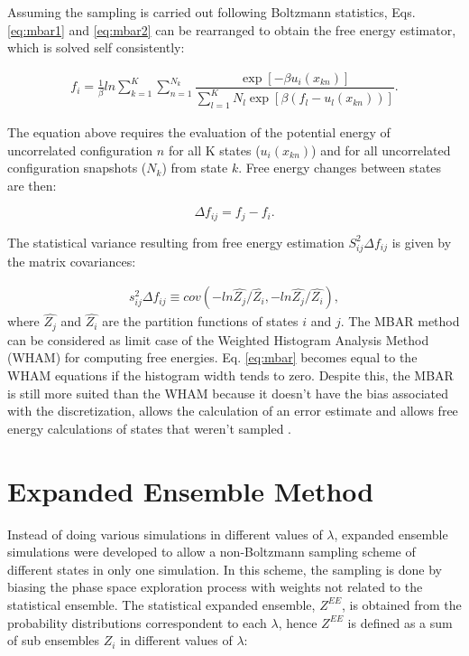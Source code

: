 	Assuming the sampling is carried out following Boltzmann statistics, Eqs. \eqref{eq:mbar1} and \eqref{eq:mbar2} can be rearranged to obtain the free energy estimator, which is solved self consistently:  
	
	\begin{equation}
	\label{eq:mbar}
	\begin{aligned}
	f_{i} = \frac{1}{\beta}ln \sum_{k=1}^{K} \sum_{n=1}^{N_{k}}
	\dfrac{\exp[-\beta u_{i}(x_{kn})]}{\sum_{l=1}^{K} N_{l} \exp[\beta (f_{l} - u_{l}(x_{kn}))]} .
	\end{aligned}
	\end{equation}
	
	The equation above requires the evaluation of the potential energy  of uncorrelated configuration $n$ for all K states ($u_{i}(x_{kn})$) and for all uncorrelated configuration snapshots ($N_{k}$) from state $k$. Free energy changes between states are then:
	
	\begin{equation}
	\Delta f_{ij} = f_{j} -  f_{i}  .
	\end{equation} 
	
	The statistical variance resulting from free energy estimation $S_{ij}^{2} \Delta f_{ij}$ is given by the matrix covariances:
	
	\begin{equation}
	\label{eq:varmbar}
	\begin{aligned}
	s_{ij}^{2} \Delta f_{ij} \equiv cov (-ln \hat{Z_{j}}/\hat{Z_{i}},-ln \hat{Z_{j}}/\hat{Z_{i}}),
	\end{aligned}
	\end{equation}
	where $\hat{Z_{j}}$ and $\hat{Z_{i}}$ are the partition functions of states $i$ and $j$. The MBAR method can be considered as limit case of the 
	Weighted Histogram Analysis Method (WHAM) \cite{wham} for computing free energies. Eq. \eqref{eq:mbar} becomes equal to the WHAM equations if the histogram width tends to zero. Despite this, the MBAR is still more suited than the WHAM because it doesn't have the bias associated with the discretization, allows the calculation of an error estimate and allows free energy calculations of states that weren't sampled \cite{mbar}.
	
\section{Expanded Ensemble Method}\label{ee}
	
	Instead of doing various simulations in different values of $\lambda$, expanded ensemble simulations \cite{lyubartsev} were developed to allow a non-Boltzmann sampling scheme of different states in only one simulation. In this scheme, the sampling is done by biasing the phase space exploration process with weights not related to the statistical ensemble. The statistical expanded ensemble, $Z^{EE}$, is obtained from the probability distributions correspondent to each $\lambda$, hence $Z^{EE}$ is defined as a sum of sub ensembles $Z_{i}$ in different values of $\lambda$:
	
